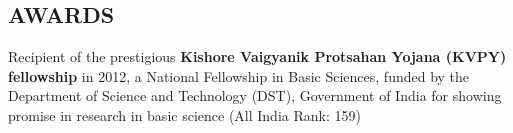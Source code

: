 \documentclass[margin]{res}
\begin{document}
\begin{resume}

\section{AWARDS }

Recipient of the prestigious \textbf{Kishore Vaigyanik Protsahan Yojana (KVPY) fellowship} in 2012, a National Fellowship
in Basic Sciences, funded by the Department of Science and Technology (DST), Government of India for showing promise in research in basic science (All India Rank: 159)
\par


\end{resume}
\end{document}

